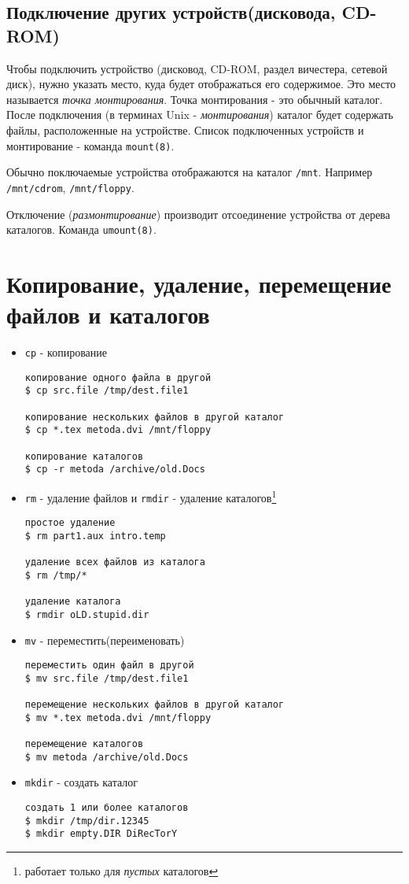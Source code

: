 \subsection{Подключение других устройств(дисковода, CD-ROM)}

Чтобы подключить устройство (дисковод, CD-ROM, раздел вичестера, сетевой диск), нужно указать место, куда будет отображаться его содержимое. Это место называется \emph{точка монтирования}. Точка монтирования - это обычный каталог. После подключения (в терминах Unix - \emph{монтирования}) каталог будет содержать файлы, расположенные на устройстве. Список подключенных устройств и монтирование - команда \verb+mount(8)+.

Обычно поключаемые устройства отображаются на каталог \verb+/mnt+. Например \verb+/mnt/cdrom+, \verb+/mnt/floppy+.

Отключение (\emph{размонтирование}) производит отсоединение устройства от дерева каталогов. Команда \verb+umount(8)+.

\section{Копирование, удаление, перемещение файлов и каталогов}
\begin{itemize}
\item \verb+cp+ - копирование
\begin{verbatim}
копирование одного файла в другой
$ cp src.file /tmp/dest.file1

копирование нескольких файлов в другой каталог
$ cp *.tex metoda.dvi /mnt/floppy

копирование каталогов
$ cp -r metoda /archive/old.Docs
\end{verbatim}

\item \verb+rm+ - удаление файлов и \verb+rmdir+ - удаление каталогов\footnote{работает только для \emph{пустых} каталогов}
\begin{verbatim}
простое удаление
$ rm part1.aux intro.temp

удаление всех файлов из каталога 
$ rm /tmp/*

удаление каталога
$ rmdir oLD.stupid.dir
\end{verbatim}

\item \verb+mv+ - переместить(переименовать)
\begin{verbatim}
переместить один файл в другой
$ mv src.file /tmp/dest.file1

перемещение нескольких файлов в другой каталог
$ mv *.tex metoda.dvi /mnt/floppy

перемещение каталогов
$ mv metoda /archive/old.Docs
\end{verbatim}

\item \verb+mkdir+ - создать каталог
\begin{verbatim}
cоздать 1 или более каталогов
$ mkdir /tmp/dir.12345
$ mkdir empty.DIR DiRecTorY
\end{verbatim}
\end{itemize}

